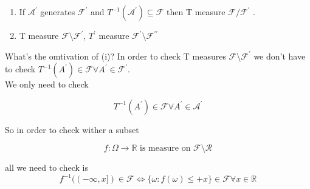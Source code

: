 \documentclass[11pt,fleqn]{book} %
\begin{document}
\begin{theorem}
	\begin{enumerate}
		\item If $\mathcal{A}^\prime$ generates $\mathcal{F}^\prime$ and $T^{-1} (\mathcal{A}^\prime) \subseteq \mathcal{F}$ then T measure $\mathcal{F}/\mathcal{F}^\prime$ .

		\item T measure $\mathcal{F}\setminus \mathcal{F}^\prime$, $T^\prime$ measure $\mathcal{F}^\prime \setminus \mathcal{F}^{\prime \prime}$
	\end{enumerate}

	What's the omtivation of (i)? In order to check T measures $\mathcal{F}\setminus \mathcal{F}^\prime$ we don't have to check $T^{-1} (A^\prime) \in \mathcal{F} \forall A^\prime \in \mathcal{F}^\prime$.\\

	We only need to check 

			$$T^{-1} (A^\prime) \in \mathcal{F} \forall A^\prime \in \mathcal{A}^\prime $$

	So in order to check wither a subset

		$$f :\Omega \rightarrow \mathbb{R} \text{ is measure on } \mathcal{F}\setminus \mathcal{R} $$

	all we need to check is 
			$$ 	f^{-1}((-\infty, x]) \in \mathcal{F} \Leftrightarrow \{\omega: f(\omega) \leq + x\} \in \mathcal{F} \forall x \in \mathbb{R}$$
\end{theorem}
\end{document}
